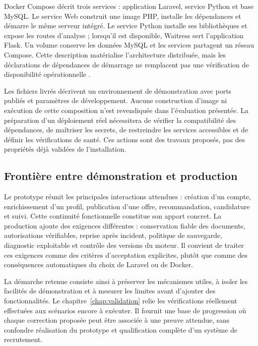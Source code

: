 Docker Compose décrit trois services : application Laravel, service Python et base MySQL. Le service Web construit une image PHP, installe les dépendances et démarre le même serveur intégré. Le service Python installe ses bibliothèques et expose les routes d'analyse ; lorsqu'il est disponible, Waitress sert l'application Flask. Un volume conserve les données MySQL et les services partagent un réseau Compose. Cette description matérialise l'architecture distribuée, mais les déclarations de dépendances de démarrage ne remplacent pas une vérification de disponibilité opérationnelle \cite{docker-compose,flask-docs}.

Les fichiers livrés décrivent un environnement de démonstration avec ports publiés et paramètres de développement. Aucune construction d'image ni exécution de cette composition n'est revendiquée dans l'évaluation présentée. La préparation d'un déploiement réel nécessitera de vérifier la compatibilité des dépendances, de maîtriser les secrets, de restreindre les services accessibles et de définir les vérifications de santé. Ces actions sont des travaux proposés, pas des propriétés déjà validées de l'installation.

\subsection{Frontière entre démonstration et production}

Le prototype réunit les principales interactions attendues : création d'un compte, enrichissement d'un profil, publication d'une offre, recommandation, candidature et suivi. Cette continuité fonctionnelle constitue son apport concret. La production ajoute des exigences différentes : conservation fiable des documents, autorisations vérifiables, reprise après incident, politique de sauvegarde, diagnostic exploitable et contrôle des versions du moteur. Il convient de traiter ces exigences comme des critères d'acceptation explicites, plutôt que comme des conséquences automatiques du choix de Laravel ou de Docker.

La démarche retenue consiste ainsi à préserver les mécanismes utiles, à isoler les facilités de démonstration et à mesurer les limites avant d'ajouter des fonctionnalités. Le chapitre~\ref{chap:validation} relie les vérifications réellement effectuées aux scénarios encore à exécuter. Il fournit une base de progression où chaque correction proposée peut être associée à une preuve attendue, sans confondre réalisation du prototype et qualification complète d'un système de recrutement.

